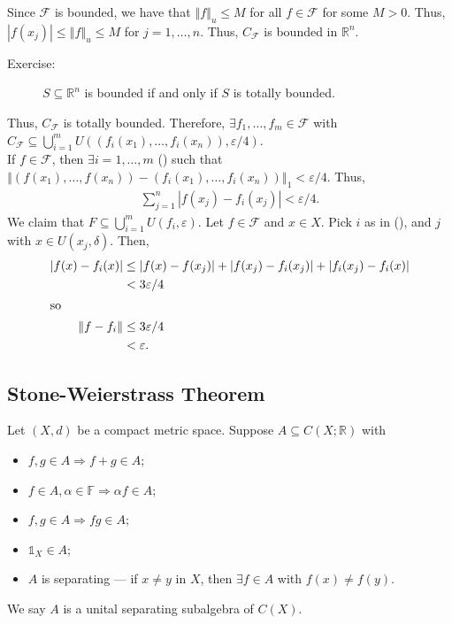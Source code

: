 \documentclass[10pt]{extarticle}
\newcommand{\R}{\mathbb{R}}
\newcommand{\norm}[1]{\left\Vert #1 \right\Vert}
\begin{document}
\begin{description}
      Since $\mathcal{F}$ is bounded, we have that $\norm{f}_u \leq M$ for all $f\in \mathcal{F}$ for some $M>0$. Thus, $|f(x_j)|\leq \norm{f}_u \leq M$ for $j = 1,\dots,n$. Thus, $C_{\mathcal{F}}$ is bounded in $\R^n$.
      \begin{description}
        \item[Exercise:] $S\subseteq \R^n$ is bounded if and only if $S$ is totally bounded.
      \end{description}
      Thus, $C_{\mathcal{F}}$ is totally bounded. Therefore, $\exists f_1,\dots,f_m\in \mathcal{F}$ with $C_{\mathcal{F}}\subseteq \bigcup_{i=1}^{m}U\left(\left(f_i(x_1),\dots,f_i(x_n)\right),\varepsilon/4\right)$.\\

      If $f\in \mathcal{F}$, then $\exists i = 1,\dots,m$ (\textasteriskcentered) such that $\norm{\left(f(x_1),\dots,f(x_n)\right)-\left(f_i(x_1),\dots,f_i(x_n)\right)}_1 < \varepsilon/4$. Thus,
      \begin{align*}
        \sum_{j=1}^{n}|f(x_j)-f_i(x_j)| < \varepsilon/4.
      \end{align*}
      We claim that $F\subseteq \bigcup_{i=1}^{m}U(f_i,\varepsilon)$. Let $f\in \mathcal{F}$ and $x\in X$. Pick $i$ as in (\textasteriskcentered), and $j$ with $x\in U(x_j,\delta)$. Then,
      \begin{align*}
        |f(x)-f_i(x)| &\leq |f(x)-f(x_j)| + |f(x_j)-f_i(x_j)| + |f_i(x_j)-f_i(x)|\\
                      &< 3\varepsilon/4\\
                      \intertext{so}
        \norm{f-f_i} &\leq 3\varepsilon/4\\
                     &< \varepsilon.
      \end{align*}
  \end{description}
  \subsection{Stone-Weierstrass Theorem}%
  Let $(X,d)$ be a compact metric space. Suppose $A\subseteq C(X;\R)$ with
  \begin{itemize}
    \item $f,g\in A \Rightarrow f + g\in A$;
    \item $f\in A,\alpha\in \mathbb{F}\Rightarrow \alpha f \in A$;
    \item $f,g\in A\Rightarrow fg\in A$;
    \item $\mathbb{1}_X \in A$;
    \item $A$ is separating --- if $x\neq y$ in $X$, then $\exists f\in A$ with $f(x)\neq f(y)$.
  \end{itemize}
  We say $A$ is a unital separating subalgebra of $C(X)$.\\
\end{document}
